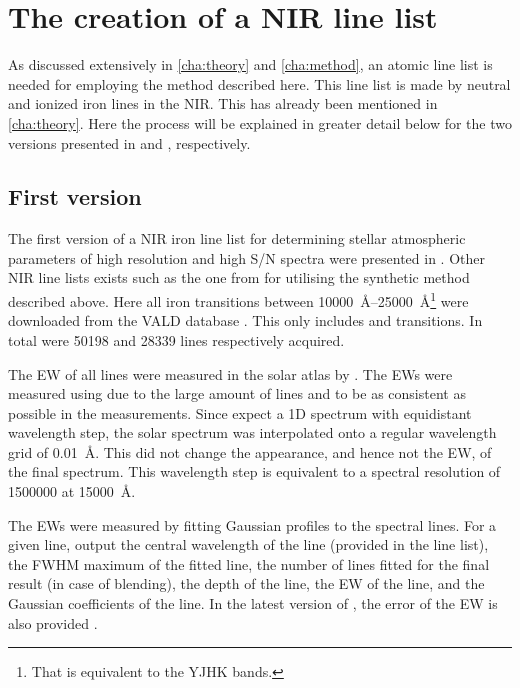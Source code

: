 \section{The creation of a NIR line list}
\label{sec:creation_line_list}

As discussed extensively in \cref{cha:theory} and \cref{cha:method}, an atomic line list is needed
for employing the method described here. This line list is made by neutral and ionized iron lines in
the NIR. This has already been mentioned in \cref{cha:theory}. Here the process will be explained in
greater detail below for the two versions presented in \citet{Andreasen2016} and
\citet{Andreasen2017a}, respectively.


\subsection{First version}
\label{sec:linelist_first}

The first version of a NIR iron line list for determining stellar atmospheric parameters of high
resolution and high S/N spectra were presented in \citet{Andreasen2016}. Other NIR line lists exists
such as the one from \citet{Onehag2012,Lindgren2016} for utilising the synthetic method described
above. Here all iron transitions between
\SIrange{10000}{25000}{\angstrom}\footnote{That is equivalent to the YJHK bands.} were downloaded
from the VALD database \citep{VALD1,VALD2}. This only includes  and 
transitions. In total were \num{50198}  and \num{28339}  lines respectively
acquired.

The EW of all lines were measured in the solar atlas by \citet{Hinkle1995}. The EWs were measured
using \ARES due to the large amount of lines and to be as consistent as possible in the
measurements. Since \ARES expect a 1D spectrum with equidistant wavelength step, the solar spectrum
was interpolated onto a regular wavelength grid of \SI{0.01}{\angstrom}. This did not change the
appearance, and hence not the EW, of the final spectrum. This wavelength step is equivalent to a
spectral resolution of \num{1500000} at \SI{15000}{\angstrom}.

The EWs were measured by fitting Gaussian profiles to the spectral lines. For a given line, \ARES
output the central wavelength of the line (provided in the line list), the FWHM maximum of the
fitted line, the number of lines fitted for the final result (in case of blending), the depth of the
line, the EW of the line, and the Gaussian coefficients of the line. In the latest version of \ARES,
the error of the EW is also provided \citep{Sousa2015a}.


